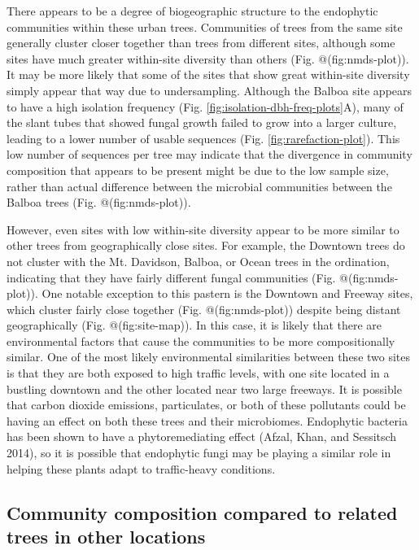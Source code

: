 \documentclass[fleqn,10pt,lineno]{wlpeerj} %
\begin{document}
There appears to be a degree of biogeographic structure to the endophytic communities within these urban trees. Communities of trees from the same site generally cluster closer together than trees from different sites, although some sites have much greater within-site diversity than others (Fig. @(fig:nmds-plot)). It may be more likely that some of the sites that show great within-site diversity simply appear that way due to undersampling. Although the Balboa site appears to have a high isolation frequency (Fig. \ref{fig:isolation-dbh-freq-plots}A), many of the slant tubes that showed fungal growth failed to grow into a larger culture, leading to a lower number of usable sequences (Fig. \ref{fig:rarefaction-plot}). This low number of sequences per tree may indicate that the divergence in community composition that appears to be present might be due to the low sample size, rather than actual difference between the microbial communities between the Balboa trees (Fig. @(fig:nmds-plot)).

However, even sites with low within-site diversity appear to be more similar to other trees from geographically close sites. For example, the Downtown trees do not cluster with the Mt. Davidson, Balboa, or Ocean trees in the ordination, indicating that they have fairly different fungal communities (Fig. @(fig:nmds-plot)). One notable exception to this pastern is the Downtown and Freeway sites, which cluster fairly close together (Fig. @(fig:nmds-plot)) despite being distant geographically (Fig. @(fig:site-map)). In this case, it is likely that there are environmental factors that cause the communities to be more compositionally similar. One of the most likely environmental similarities between these two sites is that they are both exposed to high traffic levels, with one site located in a bustling downtown and the other located near two large freeways. It is possible that carbon dioxide emissions, particulates, or both of these pollutants could be having an effect on both these trees and their microbiomes. Endophytic bacteria has been shown to have a phytoremediating effect (Afzal, Khan, and Sessitsch 2014), so it is possible that endophytic fungi may be playing a similar role in helping these plants adapt to traffic-heavy conditions.

\hypertarget{community-composition-compared-to-related-trees-in-other-locations}{%
\subsection*{Community composition compared to related trees in other locations}\label{community-composition-compared-to-related-trees-in-other-locations}}
\end{document}

